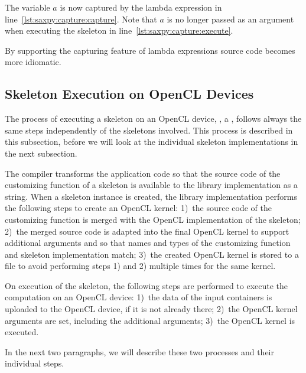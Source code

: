 The variable $a$ is now captured by the lambda expression in line~\ref{lst:saxpy:capture:capture}.
Note that $a$ is no longer passed as an argument when executing the skeleton in line~\ref{lst:saxpy:capture:execute}.

\vspace{1em}

By supporting the capturing feature of lambda expressions \SkelCL source code becomes more \Cpp idiomatic.








\subsection{Skeleton Execution on OpenCL Devices}
\label{section:skelcl-library:execution}
The process of executing a skeleton on an OpenCL device, \eg, a \GPU, follows always the same steps independently of the skeletons involved.
This process is described in this subsection, before we will look at the individual skeleton implementations in the next subsection.

The  compiler transforms the \SkelCL application code so that the source code of the customizing function of a skeleton is available to the \SkelCL library implementation as a string.
When a skeleton instance is created, the \SkelCL library implementation performs the following steps to create an OpenCL kernel:
1)~the source code of the customizing function is merged with the OpenCL implementation of the skeleton;
2)~the merged source code is adapted into the final OpenCL kernel to support additional arguments and so that names and types of the customizing function and skeleton implementation match;
3)~the created OpenCL kernel is stored to a file to avoid performing steps 1) and 2) multiple times for the same kernel.

On execution of the skeleton, the following steps are performed to execute the computation on an OpenCL device:
1)~the data of the input containers is uploaded to the OpenCL device, if it is not already there;
2)~the OpenCL kernel arguments are set, including the additional arguments;
3)~the OpenCL kernel is executed.

In the next two paragraphs, we will describe these two processes and their individual steps.


